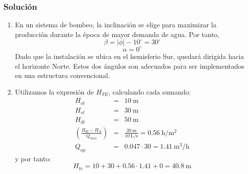 \subsubsection{Solución}

\begin{enumerate}
\item En un sistema de bombeo, la inclinación se elige para maximizar
  la producción durante la época de mayor demanda de agua. Por
  tanto, \[ \beta=|\phi|-10^{\circ}=30^{\circ}\]
  \[
  \alpha=0^{\circ}\] Dado que la instalación se ubica en el hemisferio
  Sur, quedará dirigida hacia el horizonte Norte. Estos dos ángulos
  son adecuados para ser implementados en una estructura convencional.
\item Utilizamos la expresión de $H_{TE}$, calculando cada
  sumando:\begin{eqnarray*}
    H_{ot} & = & \SI{10}{\meter}\\
    H_{st} & = & \SI{30}{\meter}\\
    H_{dt} & = & \SI{50}{\meter}\\
    (\frac{H_{dt}-H_{st}}{Q_{max}}) & = & \frac{\SI{20}{\meter}}{\SI{10}{\liter\per\second}}=\SI{0.56}{\hour\per\meter\squared}\\
    Q_{ap} & = &
    0.047\cdot30=\SI{1.41}{\meter\cubed\per\hour}\end{eqnarray*} y por
  tanto:\[ H_{te}=10+30+0.56\cdot1.41+0=\SI{40.8}{\meter}\]


\end{enumerate}
